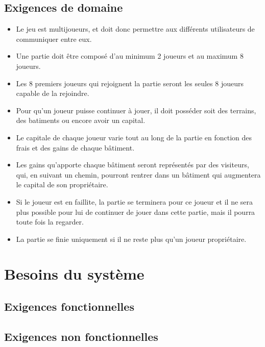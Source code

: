 \documentclass[a4paper,11pt]{report}
\begin{document}
\newpage

\section{Exigences de domaine}
\begin{itemize}
 \item Le jeu est multijoueurs, et doit donc permettre aux différents utilisateurs de communiquer entre eux.
 \item Une partie doit être composé d'au minimum 2 joueurs et au maximum 8 joueurs.
 \item Les 8 premiers joueurs qui rejoignent la partie seront les seules 8 joueurs capable de la rejoindre.
 \item Pour qu'un joueur puisse continuer à jouer, il doit posséder soit des terrains, des batiments ou encore avoir
 un capital. 
 \item Le capitale de chaque joueur varie tout au long de la partie en fonction des frais et des gains de chaque bâtiment.
 \item Les gains qu'apporte chaque bâtiment seront représentés par des visiteurs, qui, en suivant un chemin, pourront 
 rentrer dans un bâtiment qui augmentera le capital de son propriétaire.
 \item Si le joueur est en faillite, la partie se terminera pour ce joueur et il ne sera plus possible pour lui de
 continuer de jouer dans cette partie, mais il pourra toute fois la regarder.
 \item La partie se finie uniquement si il ne reste plus qu'un joueur propriétaire.

 \end{itemize}

\newpage
\chapter{Besoins du système}
\section{Exigences fonctionnelles}
\section{Exigences non fonctionnelles}
\end{document}

